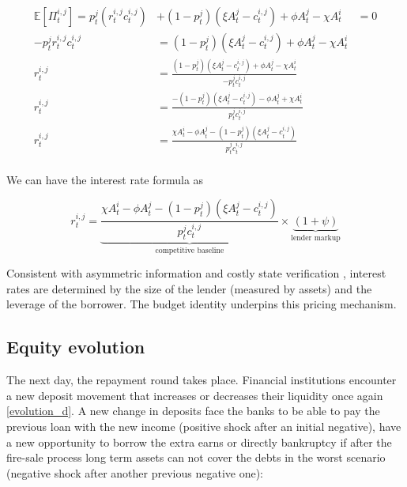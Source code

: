 \documentclass{article}
\begin{document}
\begin{align*}
\mathbb{E}[\Pi_t^{i,j}] =  p_t^j (r_t^{i,j} c_t^{i,j}) &+ (1 - p_t^j)(\xi A_t^j - c_t^{i,j})+ \phi A_t^j - \chi A_t^i &= 0 \\
-p_t^j r_t^{i,j} c_t^{i,j} &=   (1 - p_t^j)(\xi A_t^j - c_t^{i,j})+ \phi A_t^j - \chi A_t^i  \\
r_t^{i,j} &= \frac{  (1 - p_t^j)(\xi A_t^j - c_t^{i,j})+ \phi A_t^j - \chi A_t^i}{-p_t^j c_t^{i,j}}  \\
r_t^{i,j} &= \frac{  -(1 - p_t^j)(\xi A_t^j - c_t^{i,j})- \phi A_t^j + \chi A_t^i}{p_t^j c_t^{i,j}}  \\
r_t^{i,j} &= \frac{ \chi A_t^i - \phi A_t^j -(1 - p_t^j)(\xi A_t^j - c_t^{i,j}) }{p_t^j c_t^{i,j}}  \\
\end{align*}
\label{eq:profits_equal_zero}

We can have the interest rate formula as

\begin{equation}
r_t^{i,j} = \underbrace{\frac{\chi A_t^i - \phi A_t^j - (1 - p_t^j)(\xi A_t^j - c_t^{i,j})}{p_t^j c_t^{i,j}}}_{\text{competitive baseline}} \times \underbrace{(1 + \psi)}_{\text{lender markup}}
\label{eq:interest_rate_decomposed}
\end{equation}

Consistent with asymmetric information and costly state verification \cite{Bernanke1999}, interest rates are determined by the size of the lender (measured by assets) and the leverage of the borrower. The budget identity underpins this pricing mechanism.


\subsection*{Equity evolution}


The next day, the repayment round takes place. Financial institutions encounter a new deposit movement that increases or decreases their liquidity once again \ref{evolution_d}. 
A new change in deposits face the banks to be able to pay the previous loan with the new income (positive shock after an initial negative), have a new opportunity to borrow the extra earns or directly bankruptcy if after the fire-sale process long term assets can not cover the debts in the worst scenario (negative shock after another previous negative one):
\end{document}
